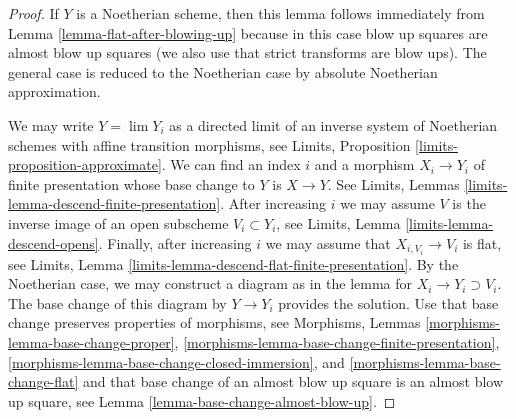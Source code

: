\documentclass[10pt,a4paper]{amsart}
\theoremstyle{plain}
\theoremstyle{definition}
\theoremstyle{remark}
\numberwithin{equation}{subsection}
\def\lim{\mathop{\mathrm{lim}}\nolimits}
\begin{document}
\begin{proof}
If $Y$ is a Noetherian scheme, then this lemma follows immediately
from Lemma \ref{lemma-flat-after-blowing-up}
because in this case blow up squares are almost blow up squares
(we also use that strict transforms are blow ups).
The general case is reduced to the Noetherian case by
absolute Noetherian approximation.

\medskip\noindent
We may write $Y = \lim Y_i$ as a directed limit of an inverse system
of Noetherian schemes with affine transition morphisms, see
Limits, Proposition \ref{limits-proposition-approximate}.
We can find an index $i$ and a morphism $X_i \to Y_i$
of finite presentation whose base change to $Y$ is $X \to Y$.
See Limits, Lemmas \ref{limits-lemma-descend-finite-presentation}.
After increasing $i$ we may assume $V$ is the inverse image of
an open subscheme $V_i \subset Y_i$, see
Limits, Lemma \ref{limits-lemma-descend-opens}.
Finally, after increasing $i$ we may assume that $X_{i, V_i} \to V_i$
is flat, see
Limits, Lemma \ref{limits-lemma-descend-flat-finite-presentation}.
By the Noetherian case, we may construct a diagram as in the
lemma for $X_i \to Y_i \supset V_i$. The base change of this
diagram by $Y \to Y_i$ provides the solution. Use that base change
preserves properties of morphisms, see Morphisms, Lemmas
\ref{morphisms-lemma-base-change-proper},
\ref{morphisms-lemma-base-change-finite-presentation},
\ref{morphisms-lemma-base-change-closed-immersion}, and
\ref{morphisms-lemma-base-change-flat}
and that base change of an almost
blow up square is an almost blow up square, see
Lemma \ref{lemma-base-change-almost-blow-up}.
\end{proof}
\end{document}
